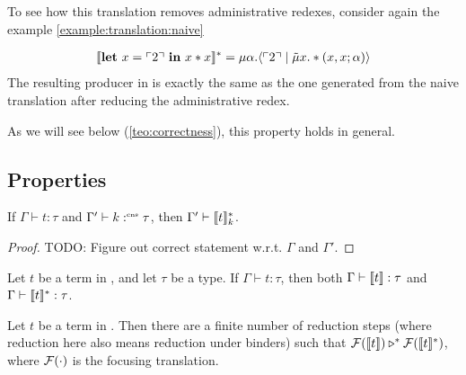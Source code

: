 To see how this translation removes administrative redexes, consider again the example \cref{example:translation:naive}
\begin{example}
  \begin{align*}
    \llbracket \mathbf{let}\ x = \ulcorner 2 \urcorner\ \mathbf{in}\ x*x \rrbracket^* = \mu\alpha.\langle \ulcorner 2 \urcorner \mid \tilde\mu x.*(x,x;\alpha) \rangle
  \end{align*}
  The resulting producer in \targetlang{} is exactly the same as the one generated from the naive translation after reducing the administrative redex.
\end{example}
As we will see below (\cref{teo:correctness}), this property holds in general.

\subsection{Properties}
\label{subsec:translation:properties}

\begin{lemma}
  If $\Gamma \vdash t : \tau$ and $\Gamma' \vdash k :^{\text{\tiny cns}} \tau$, then $\Gamma' \vdash \llbracket t \rrbracket_{k}^{\ast}$.
\end{lemma}
\begin{proof}
  TODO: Figure out correct statement w.r.t. $\Gamma$ and $\Gamma'$.
\end{proof}

\begin{theorem}
  Let $t$ be a term in \surfacelang, and let $\tau$ be a type.
  If $\Gamma \vdash t: \tau$, then both $\Gamma \vdash \llbracket t \rrbracket : \tau$ and $\Gamma \vdash \llbracket t \rrbracket_{}^{\ast} : \tau$.
\end{theorem}

\begin{theorem}[Correctness]
  \label{teo:correctness}
  Let $t$ be a term in \surfacelang. Then there are a finite number of reduction steps (where reduction here also means reduction under binders) such that $\mathcal{F}(\llbracket t \rrbracket) \triangleright^{\ast} \mathcal{F}(\llbracket t \rrbracket_{}^{\ast})$, where $\mathcal{F}(\cdot)$ is the focusing translation.
\end{theorem}
